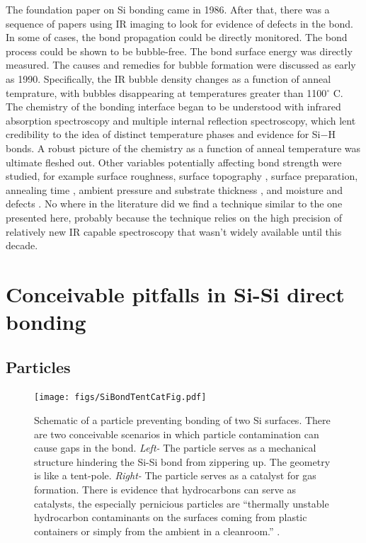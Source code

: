 \documentclass[osajnl,preprint,showpacs,superscriptaddress,12pt]{revtex4-1} %
\begin{document}
The foundation paper on Si bonding came in 1986\cite{1986JAP....60.2987S}.  After that, there was a sequence of papers using IR imaging to look for evidence of defects in the bond.  In some of cases, the bond propagation could be directly monitored\cite{1988JaJAP..27L2364S, 1995ApPhL..67.3614G}.  The bond process could be shown to be bubble-free\cite{1988JaJAP..27L2364S, 1989JaJAP..28L2141L}.  The bond surface energy was directly measured\cite{1989JaJAP..28L2141L}.  The causes and remedies for bubble formation were discussed as early as 1990\cite{Mitani1990}.  Specifically, the IR bubble density changes as a function of anneal temprature\cite{1992JEMat..21..669M}, with bubbles disappearing at temperatures greater than 1100$^\circ$ C.  The chemistry of the bonding interface began to be understood with infrared absorption spectroscopy and multiple internal reflection spectroscopy\cite{feijoo1994}, which lent credibility to the idea of distinct temperature phases and evidence for Si$-$H bonds\cite{1995ApPhA..61..101R}.  A robust picture of the chemistry as a function of anneal temperature was ultimate fleshed out\cite{1996JaJAP..35.2102R, 1998AnRMS..28..215G}.  Other variables potentially affecting bond strength were studied, for example surface roughness\cite{JJAP.37.4197}, surface topography \cite{2001JOptA...3...85G}, surface preparation\cite{1996ApPhL..68.2222T}, annealing time \cite{2000JAP....88.4404H}, ambient pressure and substrate thickness \cite{1995ApPhL..67..863G, 2007ApOpt..46.6793H}, and moisture and defects \cite{2001JAP....89.6013L}.  No where in the literature did we find a technique similar to the one presented here, probably because the technique relies on the high precision of relatively new IR capable spectroscopy that wasn't widely available until this decade.


\section{Conceivable pitfalls in Si-Si direct bonding}

\subsection{Particles}

\begin{figure}[htbp]
\centerline{\texttt{[image: figs/SiBondTentCatFig.pdf]}}
\caption{Schematic of a particle preventing bonding of two Si surfaces\label{figParticle}.  There are two conceivable scenarios in which particle contamination can cause gaps in the bond.  \emph{Left-} The particle serves as a mechanical structure hindering the Si-Si bond from zippering up.  The geometry is like a tent-pole.  \emph{Right-} The particle serves as a catalyst for gas formation.  There is evidence that hydrocarbons can serve as catalysts, the especially pernicious particles are ``thermally unstable hydrocarbon contaminants on the surfaces coming from plastic containers or simply from the ambient in a cleanroom.'' \cite{1998AnRMS..28..215G}. }
\end{figure}
\end{document}

